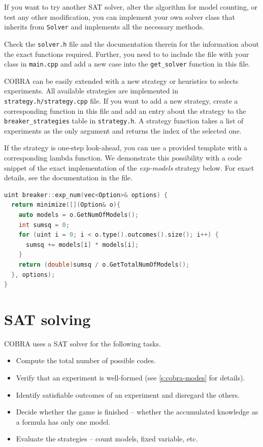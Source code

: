 If you want to try another SAT solver, alter the algorithm for model counting,
  or test any other modification,
  you can implement your own solver class that inherits from \texttt{Solver} and
  implements all the necessary methods.

Check the \texttt{solver.h} file and the documentation therein
  for the information about the exact functions required.
Further, you need to to include the file with your class in
  \texttt{main.cpp} and add a new case
  into the \texttt{get\_solver} function in this file.


COBRA can be easily extended with a new strategy or heuristics to selects experiments.
All available strategies are implemented in \texttt{strategy.h/strategy.cpp} file.
If you want to add a new strategy, create a corresponding function in this file
  and add an entry about the strategy
  to the \texttt{breaker\_strategies} table in \texttt{strategy.h}.
A strategy function takes a list of experiments as the only argument
  and returns the index of the selected one.

If the strategy is one-step look-ahead,
  you can use a provided template with a corresponding lambda function.
We demonstrate this possibility with a code snippet of
  the exact implementation of the \emph{exp-models} strategy below.
For exact details, see the documentation in the file.

\begin{lstlisting}[language=C++]
uint breaker::exp_num(vec<Option>& options) {
  return minimize([](Option& o){
    auto models = o.GetNumOfModels();
    int sumsq = 0;
    for (uint i = 0; i < o.type().outcomes().size(); i++) {
      sumsq += models[i] * models[i];
    }
    return (double)sumsq / o.GetTotalNumOfModels();
  }, options);
}
\end{lstlisting}

\section{SAT solving} \label{s:cobra-sat}

COBRA uses a SAT solver for the following tasks.
\begin{itemize}
\item Compute the total number of possible codes.
\item Verify that an experiment is well-formed (see \autoref{s:cobra-modes} for details).
\item Identify satisfiable outcomes of an experiment and disregard the others.
\item Decide whether the game is finished -- whether the accumulated
  knowledge as a formula has only one model.
\item Evaluate the strategies -- count models, fixed variable, etc.
\end{itemize}

